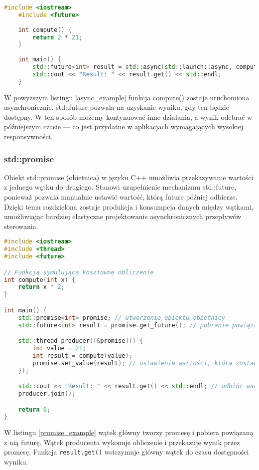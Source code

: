 \begin{lstlisting}[language=C++, caption={Przykład użycia std::async}, label={async_example}]
    #include <iostream>
    #include <future>
    
    int compute() {
        return 2 * 21;
    }
    
    int main() {
        std::future<int> result = std::async(std::launch::async, compute);
        std::cout << "Result: " << result.get() << std::endl;
    }
\end{lstlisting}
W powyższym listingu \ref{async_example} funkcja compute() zostaje uruchomiona asynchronicznie. std::future pozwala na uzyskanie wyniku, gdy ten będzie dostępny. W ten sposób możemy kontynuować inne działania, a wynik odebrać w późniejszym czasie — co jest przydatne w aplikacjach wymagających wysokiej responsywności.

\subsubsection{std::promise}
Obiekt std::promise (obietnica) w języku C++ umożliwia przekazywanie wartości z jednego wątku do drugiego. Stanowi uzupełnienie mechanizmu std::future, ponieważ pozwala manualnie ustawić wartość, którą future później odbierze. Dzięki temu rozdzielona zostaje produkcja i konsumpcja danych między wątkami, umożliwiając bardziej elastyczne projektowanie asynchronicznych przepływów sterowania.
\begin{lstlisting}[language=C++, caption={Przykład użycia std::promise}, label={promise_example}]
#include <iostream>
#include <thread>
#include <future>

// Funkcja symulująca kosztowne obliczenie
int compute(int x) {
    return x * 2;
}

int main() {
    std::promise<int> promise; // utworzenie obiektu obietnicy
    std::future<int> result = promise.get_future(); // pobranie powiązanego future

    std::thread producer([&promise]() {
        int value = 21;
        int result = compute(value);
        promise.set_value(result); // ustawienie wartości, która zostanie odebrana przez future
    });

    std::cout << "Result: " << result.get() << std::endl; // odbiór wartości, blokuje do czasu jej ustawienia
    producer.join();

    return 0;
}
\end{lstlisting}    
W listingu \ref{promise_example} wątek główny tworzy promesę i pobiera powiązaną z nią futurę. Wątek producenta wykonuje obliczenie i przekazuje wynik przez promesę. Funkcja \texttt{result.get()} wstrzymuje główny wątek do czasu dostępności wyniku.
